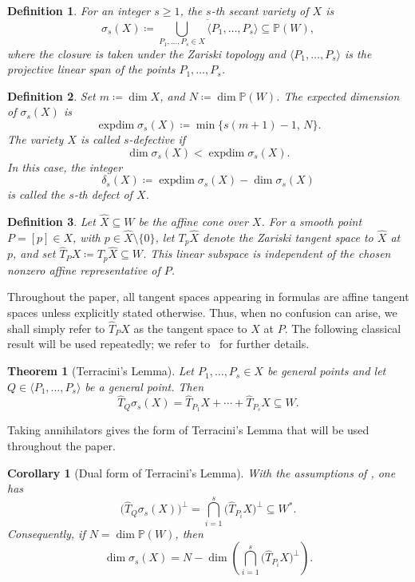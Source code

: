 \documentclass[a4paper,reqno]{amsart}
\theoremstyle{plainnopunct}
\newtheorem{theorem}{Theorem}[section]
\newtheorem{corollary}[corollary]{Corollary}
\theoremstyle{definitionnopunct}
\newtheorem{definition}[definition]{Definition}
\renewcommand{\P}{\mathbb{P}}
\DeclareMathOperator{\expdim}{expdim}
\begin{document}
\begin{definition}
\label{def: secant variety}
For an integer $s\geq1$, the \emph{$s$-th secant variety} of $X$ is
\[
\sigma_s(X)
\coloneq
\overline{
\bigcup_{P_1,\ldots,P_s\in X}
\langle P_1,\ldots,P_s\rangle
}
\subseteq
\P(W),
\]
where the  closure is taken under the Zariski topology and $\langle P_1,\ldots,P_s\rangle$ is the projective linear span of the points $P_1,\ldots,P_s$. 
\end{definition}

\begin{definition}
\label{def: secant defectivity}
Set $m\coloneq\dim X$, and $N\coloneq\dim\P(W)$. The \emph{expected dimension} of $\sigma_s(X)$ is
\[\expdim\sigma_s(X)
\coloneq
\min\bigl\{
s(m+1)-1,\,
N
\bigr\}.
\]The variety $X$ is called \emph{$s$-defective} if
\[
\dim\sigma_s(X)
<
\expdim\sigma_s(X).
\]
In this case, the integer
\[\delta_s(X)
\coloneq
\expdim\sigma_s(X)-\dim\sigma_s(X)
\]is called the \emph{$s$-th defect} of $X$.
\end{definition}

\begin{definition}
\label{def: affine tangent space}
Let $\widehat X\subseteq W$ be the affine cone over $X$. For a smooth
point $P=[p]\in X$, with $p\in\widehat X\setminus\{0\}$,
let $T_p\widehat X$ denote the Zariski tangent space to
$\widehat X$ at $p$, and set $\widehat T_PX
\coloneq
T_p\widehat X
\subseteq
W$.
This linear subspace is independent of the chosen nonzero affine
representative of $P$.
\end{definition}

Throughout the paper, all tangent spaces appearing in formulas are affine tangent spaces unless explicitly stated otherwise. Thus, when no confusion can arise, we shall simply refer to $\widehat T_PX$ as the tangent space to $X$ at $P$. The following classical result will be used repeatedly; we refer to~\cite{bernardi_hitchhiker_2018} for further details.

\begin{theorem}[Terracini's Lemma]
\label{thm: terracini}
Let $P_1,\ldots,P_s\in X$ be general points and let $Q\in
\langle P_1,\ldots,P_s\rangle$ be a general point. Then
\[\widehat T_Q\sigma_s(X)
=
\widehat T_{P_1}X
+\cdots+
\widehat T_{P_s}X
\subseteq W.
\]\end{theorem}

Taking annihilators gives the form of Terracini's Lemma that will be used throughout the paper.

\begin{corollary}[Dual form of Terracini's Lemma]
\label{cor: dual terracini}
With the assumptions of , one has
\[\bigl(
\widehat T_Q\sigma_s(X)
\bigr)^\perp
=
\bigcap_{i=1}^s
\bigl(
\widehat T_{P_i}X
\bigr)^\perp
\subseteq
W^*.
\]Consequently, if $N=\dim\P(W)$, then
\[\dim\sigma_s(X)
=
N-
\dim
\left(
\bigcap_{i=1}^s
\bigl(
\widehat T_{P_i}X
\bigr)^\perp
\right).
\]\end{corollary}
\end{document}
